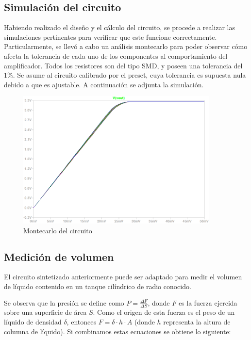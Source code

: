 \subsection{Simulaci\'on del circuito}

Habiendo realizado el dise\~no y el c\'alculo del circuito, se procede a realizar las simulaciones pertinentes para verificar que este funcione correctamente. Particularmente, se llev\'o a cabo un an\'alisis montecarlo para poder observar c\'omo afecta la tolerancia de cada uno de los componentes al comportamiento del amplificador. Todos los resistores son del tipo SMD, y poseen una tolerancia del $1\%$. Se asume al circuito calibrado por el preset, cuya tolerancia es supuesta nula debido a que es ajustable. A continuaci\'on se adjunta la simulaci\'on.

\begin{figure}[H]
    \centering
    \includegraphics[width=0.9\textwidth]{../EJ4/resources/montecarlo.png}
	\caption{Montecarlo del circuito}
   	\label{fig:EJ4_montecarlo}
\end{figure}


\subsection{Medici\'on de volumen}

El circuito sintetizado anteriormente puede ser adaptado para medir el volumen de l\'iquido contenido en un tanque cil\'indrico de radio conocido.

Se observa que la presi\'on se define como $P = \frac{\Delta F}{\Delta S}$, donde $F$ es la fuerza ejercida sobre una superficie de \'area $S$. Como el origen de esta fuerza es el peso de un l\'iquido de densidad $\delta$, entonces $F = \delta \cdot h \cdot A$ (donde $h$ representa la altura de columna de l\'iquido). Si combinamos estas ecuaciones se obtiene lo siguiente:

